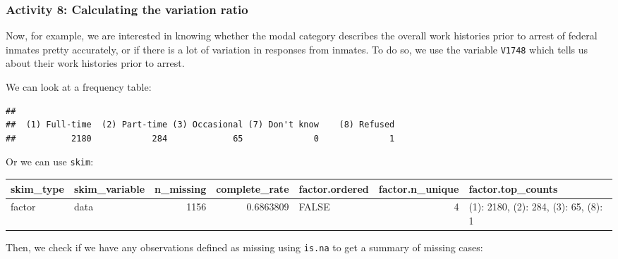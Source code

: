 \documentclass[
]{book}
\newenvironment{Shaded}{\begin{snugshade}}{\end{snugshade}}
\newcommand{\FunctionTok}[1]{\textcolor[rgb]{0.00,0.00,0.00}{#1}}
\newcommand{\NormalTok}[1]{#1}
\newcommand{\SpecialCharTok}[1]{\textcolor[rgb]{0.00,0.00,0.00}{#1}}
\begin{document}
\hypertarget{activity-8-calculating-the-variation-ratio}{%
\subsubsection{Activity 8: Calculating the variation ratio}\label{activity-8-calculating-the-variation-ratio}}

Now, for example, we are interested in knowing whether the modal category describes the overall work histories prior to arrest of federal inmates pretty accurately, or if there is a lot of variation in responses from inmates. To do so, we use the variable \texttt{V1748} which tells us about their work histories prior to arrest.

We can look at a frequency table:

\begin{Shaded}
\end{Shaded}

\begin{verbatim}
## 
##  (1) Full-time  (2) Part-time (3) Occasional (7) Don't know    (8) Refused 
##           2180            284             65              0              1
\end{verbatim}

Or we can use \texttt{skim}:

\begin{tabular}{l|l|r|r|l|r|l}
\hline
skim\_type & skim\_variable & n\_missing & complete\_rate & factor.ordered & factor.n\_unique & factor.top\_counts\\
\hline
factor & data & 1156 & 0.6863809 & FALSE & 4 & (1): 2180, (2): 284, (3): 65, (8): 1\\
\hline
\end{tabular}

\begin{Shaded}
\end{Shaded}

Then, we check if we have any observations defined as missing using \texttt{is.na} to get a summary of missing cases:

\begin{Shaded}
\end{Shaded}
\end{document}
